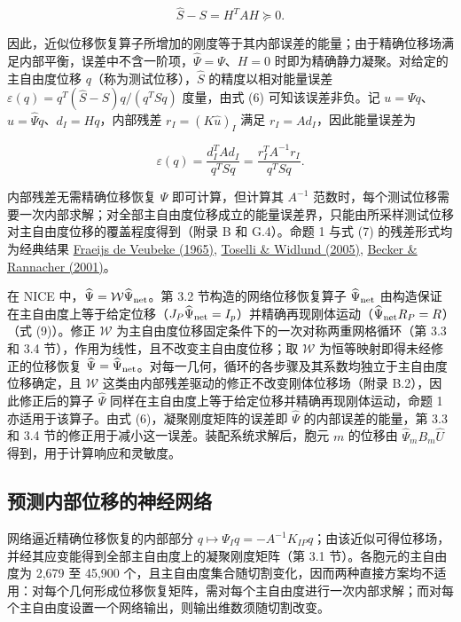 \documentclass[preprint,12pt,authoryear]{elsarticle}
\begin{document}
\[
\boxed{\widehat S-S=H^TAH\succeq0.}
\tag{6}
\]

因此，近似位移恢复算子所增加的刚度等于其内部误差的能量；由于精确位移场满足内部平衡，误差中不含一阶项，\(\widehat\Psi=\Psi\)、\(H=0\) 时即为精确静力凝聚。对给定的主自由度位移 \(q\)（称为测试位移），\(\widehat S\) 的精度以相对能量误差 \(\varepsilon(q)=q^T(\widehat S-S)q/(q^TSq)\) 度量，由式 (6) 可知该误差非负。记 \(u=\Psi q\)、\(\widehat u=\widehat\Psi q\)、\(d_I=Hq\)，内部残差 \(r_I=(K\widehat u)_I\) 满足 \(r_I=Ad_I\)，因此能量误差为

\[
\varepsilon(q)=\frac{d_I^TAd_I}{q^TSq}
=\frac{r_I^TA^{-1}r_I}{q^TSq}.
\tag{7}
\]

内部残差无需精确位移恢复 \(\Psi\) 即可计算，但计算其 \(A^{-1}\) 范数时，每个测试位移需要一次内部求解；对全部主自由度位移成立的能量误差界，只能由所采样测试位移对主自由度位移的覆盖程度得到（附录 B 和 G.4）。命题 1 与式 (7) 的残差形式均为经典结果 \href{https://doi.org/10.1002/nme.339}{Fraeijs de Veubeke (1965)}, \href{https://doi.org/10.1007/b137868}{Toselli \& Widlund (2005)}, \href{https://doi.org/10.1017/S0962492901000010}{Becker \& Rannacher (2001)}。

在 NICE 中，\(\widehat\Psi=\mathcal W\widehat\Psi_{\rm net}\)。第 3.2 节构造的网络位移恢复算子 \(\widehat\Psi_{\rm net}\) 由构造保证在主自由度上等于给定位移（\(J_P\widehat\Psi_{\rm net}=I_p\)）并精确再现刚体运动（\(\widehat\Psi_{\rm net}R_P=R\)）（式 (9)）。修正 \(\mathcal W\) 为主自由度位移固定条件下的一次对称两重网格循环（第 3.3 和 3.4 节），作用为线性，且不改变主自由度位移；取 \(\mathcal W\) 为恒等映射即得未经修正的位移恢复 \(\widehat\Psi=\widehat\Psi_{\rm net}\)。对每一几何，循环的各步骤及其系数均独立于主自由度位移确定，且 \(\mathcal W\) 这类由内部残差驱动的修正不改变刚体位移场（附录 B.2），因此修正后的算子 \(\widehat\Psi\) 同样在主自由度上等于给定位移并精确再现刚体运动，命题 1 亦适用于该算子。由式 (6)，凝聚刚度矩阵的误差即 \(\widehat\Psi\) 的内部误差的能量，第 3.3 和 3.4 节的修正用于减小这一误差。装配系统求解后，胞元 \(m\) 的位移由 \(\widehat\Psi_mB_m\widehat U\) 得到，用于计算响应和灵敏度。

\subsection{预测内部位移的神经网络}

网络逼近精确位移恢复的内部部分 \(q\mapsto \Psi_Iq=-A^{-1}K_{IP}q\)；由该近似可得位移场，并经其应变能得到全部主自由度上的凝聚刚度矩阵（第 3.1 节）。各胞元的主自由度为 2,679 至 45,900 个，且主自由度集合随切割变化，因而两种直接方案均不适用：对每个几何形成位移恢复矩阵，需对每个主自由度进行一次内部求解；而对每个主自由度设置一个网络输出，则输出维数须随切割改变。
\end{document}
